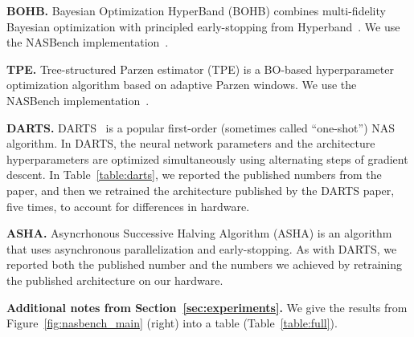 \documentclass[11pt]{article}
\numberwithin{equation}{section}
\numberwithin{figure}{section}
\theoremstyle{plain}
\theoremstyle{definition}
\begin{document}
\textbf{BOHB.}
Bayesian Optimization HyperBand (BOHB) combines multi-fidelity
Bayesian optimization with principled early-stopping from Hyperband~\cite{bohb}.
We use the NASBench implementation~\cite{nasbench}.

\textbf{TPE.}
Tree-structured Parzen estimator (TPE) is a BO-based
hyperparameter optimization algorithm based on
adaptive Parzen windows.
We use the NASBench implementation~\cite{nasbench}.

\textbf{DARTS.}
DARTS~\cite{darts} is a popular first-order (sometimes called ``one-shot'') NAS
algorithm. In DARTS, the neural network parameters and the architecture hyperparameters
are optimized simultaneously using alternating steps of gradient descent.
In Table~\ref{table:darts}, we reported the published numbers from the paper, and
then we retrained the architecture published by the DARTS paper, five times, 
to account for differences in hardware.

\textbf{ASHA.}
Asyncrhonous Successive Halving Algorithm (ASHA) is an algorithm that
uses asynchronous parallelization and early-stopping. 
As with DARTS, we reported both the published number and the numbers we achieved by 
retraining the published architecture on our hardware.

\textbf{Additional notes from Section~\ref{sec:experiments}.}
We give the results from Figure~\ref{fig:nasbench_main} (right) into a table (Table~\ref{table:full}).
\end{document}
